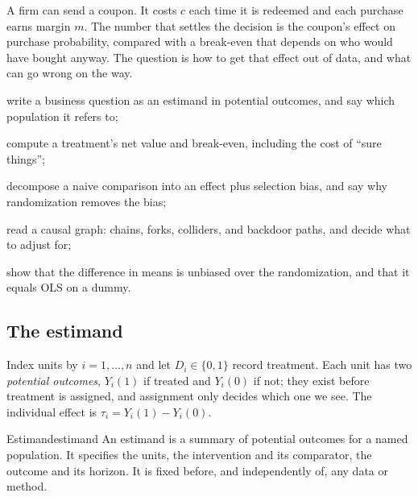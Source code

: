 \documentclass[11pt]{article}
\begin{document}

\begin{decision}
A firm can send a coupon. It costs $c$ each time it is redeemed and each purchase earns margin $m$. The
number that settles the decision is the coupon's effect on purchase probability, compared with a
break-even that depends on who would have bought anyway. The question is how to get that effect out of data,
and what can go wrong on the way.
\end{decision}

\begin{goals}
  \item write a business question as an estimand in potential outcomes, and say which population it
  refers to;
  \item compute a treatment's net value and break-even, including the cost of ``sure things'';
  \item decompose a naive comparison into an effect plus selection bias, and say why randomization
  removes the bias;
  \item read a causal graph: chains, forks, colliders, and backdoor paths, and decide what to adjust for;
  \item show that the difference in means is unbiased over the randomization, and that it equals OLS on a
  dummy.
\end{goals}

\sectionone

\subsection{The estimand}

Index units by $i = 1, \dots, n$ and let $D_i \in \{0,1\}$ record treatment. Each unit has two
\emph{potential outcomes}, $Y_i(1)$ if treated and $Y_i(0)$ if not; they exist before treatment is
assigned, and assignment only decides which one we see. The individual effect is
$\tau_i = Y_i(1) - Y_i(0)$.

\begin{defn}{Estimand}{estimand}
An estimand is a summary of potential outcomes for a named population. It specifies the units, the
intervention and its comparator, the outcome and its horizon. It is fixed before, and independently of,
any data or method.
\end{defn}
\end{document}
